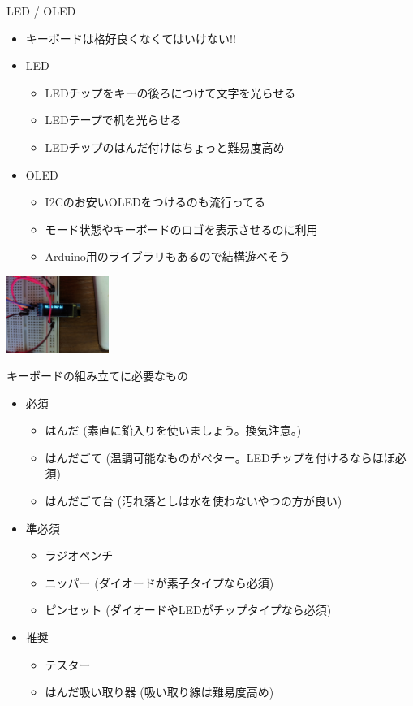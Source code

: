 \documentclass[cjk,dvipdfmx,10pt,compress,fragile%
hyperref={bookmarks=true,bookmarksnumbered=true,bookmarksopen=false,%
colorlinks=false,%
pdftitle={第 134 回 関西 Debian 勉強会},%
pdfauthor={小林},%
pdfsubject={資料},%
}]{beamer}
\begin{document}
\begin{frame}[fragile,t]{LED / OLED}
 \begin{itemize}
  \item キーボードは格好良くなくてはいけない!!
  \item LED
	\begin{itemize}
	 \item LEDチップをキーの後ろにつけて文字を光らせる
	 \item LEDテープで机を光らせる
	 \item LEDチップのはんだ付けはちょっと難易度高め
	\end{itemize}
  \item OLED
	\begin{itemize}
	 \item I2Cのお安いOLEDをつけるのも流行ってる
	 \item モード状態やキーボードのロゴを表示させるのに利用
	 \item Arduino用のライブラリもあるので結構遊べそう
	\end{itemize}
 \end{itemize}
 \begin{center}
  \includegraphics[keepaspectratio,height=2.5cm]{./img/oled-hello-world.jpg}
 \end{center}
\end{frame}

\begin{frame}[fragile,t]{キーボードの組み立てに必要なもの}
 \begin{itemize}
  \item 必須
	\begin{itemize}
	 \item はんだ (素直に鉛入りを使いましょう。換気注意。)
	 \item はんだごて (温調可能なものがベター。LEDチップを付けるならほぼ必須)
	 \item はんだごて台 (汚れ落としは水を使わないやつの方が良い)
	\end{itemize}
  \item 準必須
	\begin{itemize}
	 \item ラジオペンチ
	 \item ニッパー (ダイオードが素子タイプなら必須)
	 \item ピンセット (ダイオードやLEDがチップタイプなら必須)
	\end{itemize}
  \item 推奨
	\begin{itemize}
	 \item テスター
	 \item はんだ吸い取り器 (吸い取り線は難易度高め)
	\end{itemize}
 \end{itemize}
\end{frame}
\end{document}
